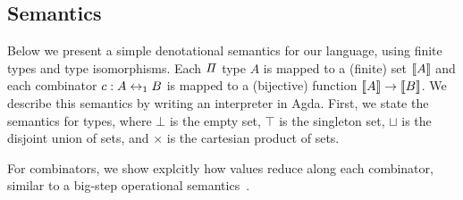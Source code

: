 



\subsection{Semantics}
\label{subsec:denotational}

\noindent Below we present a simple denotational semantics for our language, using finite types and type isomorphisms.
Each $\mathit{\Pi}$ type $A$ is mapped to a (finite) set $\llbracket A\rrbracket$ and each combinator $c : A \leftrightarrow_1 B$ is mapped to a
(bijective) function $\llbracket A\rrbracket \to \llbracket B\rrbracket$. We describe this semantics by writing an interpreter in Agda. First, we
state the semantics for types, where $\bot$ is the empty set, $\top$ is the singleton set, $\sqcup$ is the disjoint
union of sets, and $\times$ is the cartesian product of sets.


\begin{center}
  {}
\end{center}

For combinators, we show explcitly how values reduce along each combinator, similar to a big-step operational
semantics~\cite{chenComputationalInterpretationCompact2021,theseus}.

